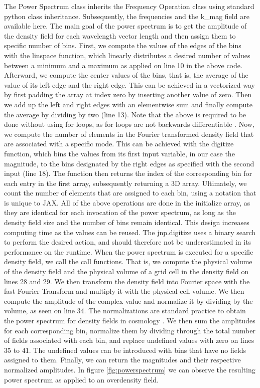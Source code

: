 \documentclass{article}
\begin{document}
The Power Spectrum class inherits the Frequency Operation class using standard python class inheritance. Subsequently, the frequencies and the {k\_mag} field are available here. The main goal of the power spectrum is to get the amplitude of the density field for each wavelength vector length and then assign them to specific number of bins. First, we compute the values of the edges of the bins with the {linspace} function, which linearly distributes a desired number of values between a minimum and a maximum as applied on line 10 in the above code. Afterward, we compute the center values of the bins, that is, the average of the value of its left edge and the right edge. This can be achieved in a vectorized way by first padding the array at index zero by inserting another value of zero. Then we add up the left and right edges with an elementwise sum and finally compute the average by dividing by two (line 13). Note that the above is required to be done without using for loops, as for loops are not backwards differentiable \citep{jax2018github}. Now, we compute the number of elements in the Fourier transformed density field that are associated with a specific mode. This can be achieved with the digitize function, which bins the values from its first input variable, in our case the magnitude, to the bins designated by the right edges as specified with the second input (line 18). The function then returns the index of the corresponding bin for each entry in the first array, subsequently returning a 3D array. Ultimately, we count the number of elements that are assigned to each bin, using a notation that is unique to JAX. All of the above operations are done in the initialize array, as they are identical for each invocation of the power spectrum, as long as the density field size and the number of bins remain identical. This design increases computing time as the values can be reused. The {jnp.digitize} uses a binary search to perform the desired action, and should therefore not be underestimated in its performance on the runtime.
When the power spectrum is executed for a specific density field, we call the call functions. That is, we compute the physical volume of the density field and the physical volume of a grid cell in the density field on lines 28 and 29. We then transform the density field into Fourier space with the fast Fourier Transform and multiply it with the physical cell volume. We then compute the amplitude of the complex value and normalize it by dividing by the volume, as seen on line 34. The normalizations are standard practice to obtain the power spectrum for density fields in cosmology \citep{murray2018powerbox}. We then sum the amplitudes for each corresponding bin, normalize them by dividing through the total number of fields associated with each bin, and replace undefined values with zero on lines 35 to 41. The undefined values can be introduced with bins that have no fields assigned to them. Finally, we can return the magnitudes and their respective normalized amplitudes. In figure \ref{fig:powerspectrum} we can observe the resulting power spectrum as applied to an overdensity field. 
\end{document}
